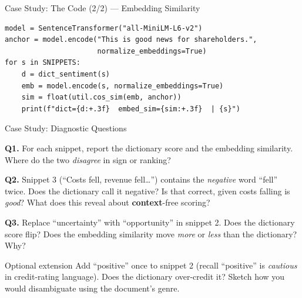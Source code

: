 \documentclass[9pt,t]{beamer}
\begin{document}
\begin{frame}[fragile]{Case Study: The Code (2/2) --- Embedding Similarity}

\begin{lstlisting}
model = SentenceTransformer("all-MiniLM-L6-v2")
anchor = model.encode("This is good news for shareholders.",
                      normalize_embeddings=True)
for s in SNIPPETS:
    d = dict_sentiment(s)
    emb = model.encode(s, normalize_embeddings=True)
    sim = float(util.cos_sim(emb, anchor))
    print(f"dict={d:+.3f}  embed_sim={sim:+.3f}  | {s}")
\end{lstlisting}
\end{frame}

\begin{frame}{Case Study: Diagnostic Questions}

\textbf{Q1.} For each snippet, report the dictionary score and the embedding
similarity. Where do the two \emph{disagree} in sign or ranking?

\medskip
\textbf{Q2.} Snippet 3 (``Costs fell, revenue fell\dots'') contains the
\emph{negative} word ``fell'' twice. Does the dictionary call it negative? Is that
correct, given costs falling is \emph{good}? What does this reveal about
\textbf{context}-free scoring?

\medskip
\textbf{Q3.} Replace ``uncertainty'' with ``opportunity'' in snippet 2. Does the
dictionary score flip? Does the embedding similarity move \emph{more} or
\emph{less} than the dictionary? Why?

\medskip
\begin{block}{Optional extension}
Add ``positive'' once to snippet 2 (recall ``positive'' is \emph{cautious} in
credit-rating language). Does the dictionary over-credit it? Sketch how you would
disambiguate using the document's genre.
\end{block}
\end{frame}
\end{document}
